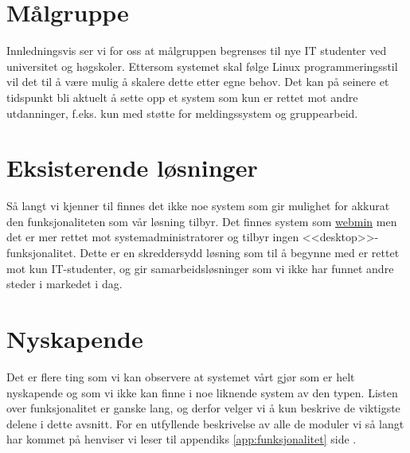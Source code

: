 \section{Målgruppe} \label{sec:målgruppe}
Innledningsvis ser vi for oss at målgruppen begrenses til nye IT studenter ved universitet og høgskoler. Ettersom systemet skal følge Linux programmeringsstil\cite{book:unixprog} vil det til å være mulig å skalere dette etter egne behov. Det kan på seinere et tidspunkt bli aktuelt å sette opp et system som kun er rettet mot andre utdanninger, f.eks. kun med støtte for meldingssystem og gruppearbeid.

\section{Eksisterende løsninger}
Så langt vi kjenner til finnes det ikke noe system som gir mulighet for akkurat den funksjonaliteten som vår løsning tilbyr. Det finnes system som \href{http://en.wikipedia.org/wiki/Webmin}{webmin} men det er mer rettet mot systemadministratorer og tilbyr ingen <<desktop>>-funksjonalitet. Dette er en skreddersydd løsning som til å begynne med er rettet mot kun IT-studenter, og gir samarbeidsløsninger som vi ikke har funnet andre steder i markedet i dag.

\section{Nyskapende}
Det er flere ting som vi kan observere at systemet vårt gjør som er helt nyskapende og som vi ikke kan finne i noe liknende system av den typen. Listen over funksjonalitet er ganske lang, og derfor velger vi å kun beskrive de viktigste delene i dette avsnitt. For en utfyllende beskrivelse av alle de moduler vi så langt har kommet på henviser vi leser til appendiks \ref{app:funksjonalitet} side \pageref{app:funksjonalitet}.


